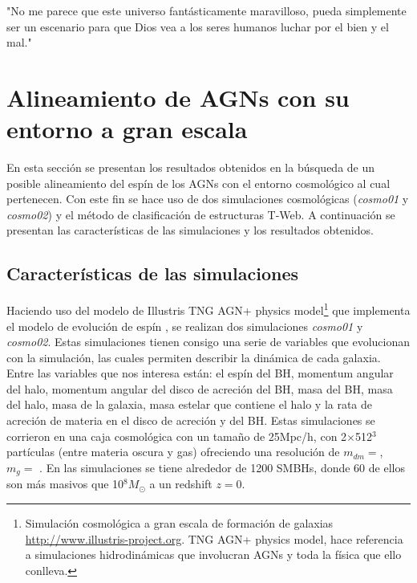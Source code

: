 \begin{savequote}[60mm]
"No me parece que este universo fantásticamente maravilloso, pueda simplemente ser un escenario para que Dios vea a los seres humanos luchar por el bien y el mal."
\end{savequote}




\chapter{Alineamiento de AGNs con su entorno a gran escala}
\label{cha:cosmic_web}

En esta sección se presentan los resultados obtenidos en la búsqueda de un posible alineamiento del espín de los AGNs con el entorno cosmológico al cual pertenecen. Con este fin  se hace uso de dos simulaciones cosmológicas ({\it{cosmo01}} y {\it{cosmo02}}) y el método  de clasificación de estructuras T-Web. A continuación se presentan las características de las simulaciones y  los resultados obtenidos.

\section{Características de las simulaciones}
\label{sec: propiedades en las simulaciones}

Haciendo uso del modelo de Illustris TNG AGN+ physics model\footnote{Simulación cosmológica a gran escala de formación de galaxias \url{http://www.illustris-project.org}. TNG AGN+ physics model, hace referencia a simulaciones hidrodinámicas que involucran AGNs y toda la física que ello conlleva.} que implementa el modelo de evolución de espín \cite{Bustamante2018b}, se realizan dos simulaciones {\it{cosmo01}} y {\it{cosmo02}}. Estas simulaciones tienen consigo una serie de variables que evolucionan con la simulación, las cuales permiten describir la dinámica de cada galaxia.
Entre las variables que nos interesa están: el espín del BH, momentum angular del halo, momentum angular del disco de acreción del BH, masa del BH, masa del halo, masa de la galaxia, masa estelar que contiene el halo y la rata de acreción de materia en el disco de acreción y del BH. Estas simulaciones se corrieron en una caja cosmológica con un tamaño de 25Mpc/h, con 2$\times$512$^{3}$ partículas (entre materia oscura y gas) %
ofreciendo una resolución de $m_{dm}=$, $m_{g} = $ 
. En las simulaciones se tiene alrededor de 1200 SMBHs, donde 60 de ellos son más masivos que 10$^{8}M_{\odot}$ a un redshift $z=0$.

